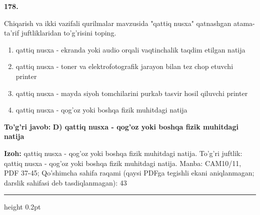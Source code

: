 \documentclass[10pt,a4paper]{article}
\begin{document}
{\bfseries\sffamily\color{ink} 178.}
\par
Chiqarish va ikki vazifali qurilmalar mavzusida "qattiq nusxa" qatnashgan atama-ta'rif juftliklaridan to'g'risini toping.
\begin{enumerate}[label=\Alph*),leftmargin=9mm]
\item qattiq nusxa - ekranda yoki audio orqali vaqtinchalik taqdim etilgan natija
\item qattiq nusxa - toner va elektrofotografik jarayon bilan tez chop etuvchi printer
\item qattiq nusxa - mayda siyoh tomchilarini purkab tasvir hosil qiluvchi printer
\item qattiq nusxa - qog'oz yoki boshqa fizik muhitdagi natija
\end{enumerate}
\begin{tcolorbox}[enhanced,breakable,colback=teal!4,colframe=teal!60!black,boxrule=0.45pt,arc=1.2mm,left=2.7mm,right=2.7mm,top=1.8mm,bottom=1.8mm,before skip=2mm,after skip=2mm]
{\bfseries\sffamily\color{teal}To'g'ri javob:} \textbf{D) qattiq nusxa - qog'oz yoki boshqa fizik muhitdagi natija}
\par\smallskip
{\bfseries Izoh:} qattiq nusxa - qog'oz yoki boshqa fizik muhitdagi natija. To'g'ri juftlik: qattiq nusxa - qog'oz yoki boshqa fizik muhitdagi natija. Manba: CAM10/11, PDF 37-45; Qo'shimcha sahifa raqami (qaysi PDFga tegishli ekani aniqlanmagan; darslik sahifasi deb tasdiqlanmagan): 43
\end{tcolorbox}
\vspace{2mm}\hrule height 0.2pt\vspace{3mm}
\end{document}
